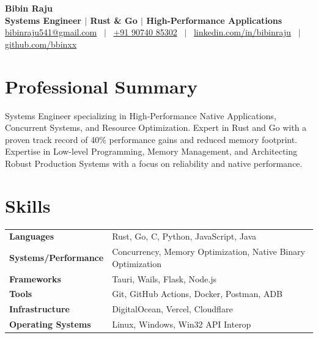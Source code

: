 \documentclass[a4paper,10pt]{article}
\begin{document}
\pagestyle{empty}

\begin{center}
{\LARGE \textbf{Bibin Raju}}\\[3pt]
\textbf{Systems Engineer $|$ Rust \& Go $|$ High-Performance Applications}\\[3pt]
\href{mailto:bibinraju541@gmail.com}{bibinraju541@gmail.com}
~$|$~
\href{tel:+919074085302}{+91 90740 85302}
~$|$~
\href{https://www.linkedin.com/in/bibinraju/}{linkedin.com/in/bibinraju}
~$|$~
\href{https://github.com/bbinxx}{github.com/bbinxx}
\end{center}

\vspace{-5pt}

\section*{Professional Summary}

Systems Engineer specializing in High-Performance Native Applications, Concurrent Systems, and Resource Optimization. Expert in Rust and Go with a proven track record of 40\% performance gains and reduced memory footprint. Expertise in Low-level Programming, Memory Management, and Architecting Robust Production Systems with a focus on reliability and native performance.

\section*{Skills}

\renewcommand{\arraystretch}{1.05}
\begin{tabular}{@{} >{\bfseries}p{3.8cm} p{13cm} @{}}
Languages           & Rust, Go, C, Python, JavaScript, Java \\
Systems/Performance & Concurrency, Memory Optimization, Native Binary Optimization \\
Frameworks          & Tauri, Wails, Flask, Node.js \\
Tools               & Git, GitHub Actions, Docker, Postman, ADB \\
Infrastructure      & DigitalOcean, Vercel, Cloudflare \\
Operating Systems   & Linux, Windows, Win32 API Interop \\
\end{tabular}
\end{document}
